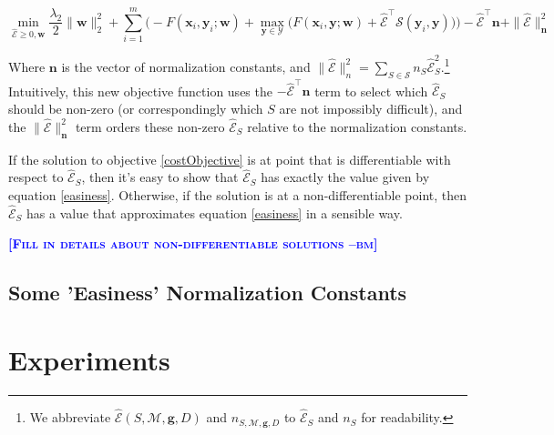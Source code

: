 \documentclass{article} %
\newcommand{\bmcomment}[1]{\textcolor{blue}{\textsc{\textbf{[#1 --bm]}}}}
\begin{document}
\begin{equation}
\label{costObjective}
\min_{\mathbf{\mathcal{\hat{E}}}\geq 0,\mathbf{w}} \frac{\lambda_2}{2}\|\mathbf{w}\|_2^2 + \sum_{i=1}^m\bigg(-F(\mathbf{x}_i,\mathbf{y}_i;\mathbf{w})+\max_{\mathbf{y}\in \mathcal{Y}}\Big(F(\mathbf{x}_i,\mathbf{y};\mathbf{w})+\mathbf{\mathcal{\hat{E}}}^\top \mathbf{\mathcal{S}}(\mathbf{y}_i,\mathbf{y})\Big)\bigg)-\mathbf{\mathcal{\hat{E}}}^\top\mathbf{n}+\|\mathbf{\mathcal{\hat{E}}}\|^2_\mathbf{n}
\end{equation}

Where $\mathbf{n}$ is the vector of normalization constants, and 
$\|\mathbf{\mathcal{\hat{E}}}\|^2_n=\sum_{S\in\mathcal{S}}n_S\mathcal{\hat{E}}_S^2$.\footnote{
  We abbreviate $\mathcal{\hat{E}}(S,\mathcal{M},\mathbf{g},D)$ and 
 $n_{S,\mathcal{M},\mathbf{g},D}$ to $\mathcal{\hat{E}}_S$ and $n_S$ for 
 readability.
}
Intuitively, this new objective function uses the 
$-\mathbf{\mathcal{\hat{E}}}^\top\mathbf{n}$ term to select which 
$\mathcal{\hat{E}}_S$
should be non-zero (or correspondingly which $S$ are not 
impossibly difficult), and the $\|\mathcal{\hat{E}}\|^2_\mathbf{n}$ term orders
these non-zero $\mathcal{\hat{E}}_S$ relative to 
the normalization constants.

If the solution to objective \ref{costObjective} is at point that is 
differentiable with respect to $\mathcal{\hat{E}}_S$, then it's easy to 
show that $\mathcal{\hat{E}}_S$ has exactly the value given by 
equation \ref{easiness}.
Otherwise, if the solution is at a non-differentiable point, then 
$\mathcal{\hat{E}}_S$ has a value that approximates equation \ref{easiness}
in a sensible way.  

\bmcomment{Fill in details about non-differentiable solutions}

\subsection{Some 'Easiness' Normalization Constants}



\section{Experiments}
\end{document}
